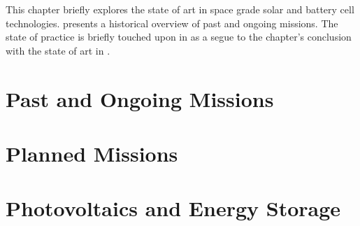 This chapter briefly explores the state of art in space grade solar and battery cell technologies.  presents a historical overview of past and ongoing missions. The state of practice is briefly touched upon in  as a segue to the chapter's conclusion with the state of art in .

\section{Past and Ongoing Missions}
\label{sec:StateOfTheArt:PastAndOngoingMissions}


\clearpage
\section{Planned Missions}
\label{sec:StateOfTheArt:PlannedMissions}


\section{Photovoltaics and Energy Storage}
\label{sec:StateOfTheArt:PhotovoltaicsAndEnergyStorage}


